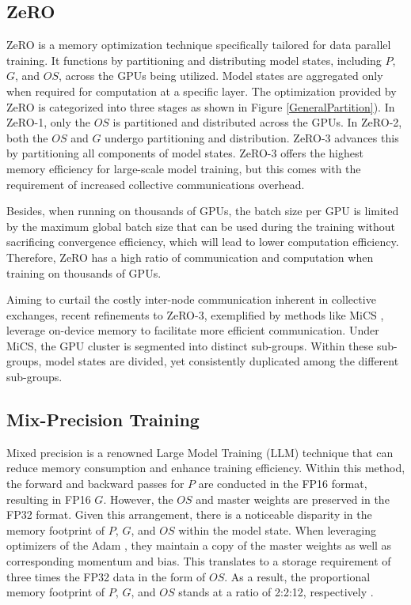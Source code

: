 \subsection{ZeRO}
\label{ZeRO}
ZeRO is a memory optimization technique specifically tailored for data parallel training. It functions by partitioning and distributing model states, including $P$, $G$, and $OS$, across the GPUs being utilized. Model states are aggregated only when required for computation at a specific layer. The optimization provided by ZeRO is categorized into three stages as shown in Figure \ref{GeneralPartition}). In ZeRO-1, only the $OS$ is partitioned and distributed across the GPUs. In ZeRO-2, both the $OS$ and $G$ undergo partitioning and distribution. ZeRO-3 advances this by partitioning all components of model states. ZeRO-3 offers the highest memory efficiency for large-scale model training, but this comes with the requirement of increased collective communications overhead. 

Besides, when running on thousands of GPUs, the batch size per GPU is limited by the maximum global batch size that can be used during the training without sacrificing convergence efficiency, which will lead to lower computation efficiency. Therefore, ZeRO has a high ratio of communication and computation when training on thousands of GPUs.

Aiming to curtail the costly inter-node communication inherent in collective exchanges, recent refinements to ZeRO-3, exemplified by methods like MiCS \cite{MiCS}, leverage on-device memory to facilitate more efficient communication. Under MiCS, the GPU cluster is segmented into distinct sub-groups. Within these sub-groups, model states are divided, yet consistently duplicated among the different sub-groups. 

\subsection{Mix-Precision Training}
\label{mixprecision}

Mixed precision is a renowned Large Model Training (LLM) technique that can reduce memory consumption and enhance training efficiency. Within this method, the forward and backward passes for $P$ are conducted in the FP16 format, resulting in FP16 $G$. However, the $OS$ and master weights are preserved in the FP32 format. Given this arrangement, there is a noticeable disparity in the memory footprint of $P$, $G$, and $OS$ within the model state. When leveraging optimizers of the Adam \cite{Adam}, they maintain a copy of the master weights as well as corresponding momentum and bias. This translates to a storage requirement of three times the FP32 data in the form of $OS$. As a result, the proportional memory footprint of $P$, $G$, and $OS$ stands at a ratio of 2:2:12, respectively \cite{mixprecision}.



